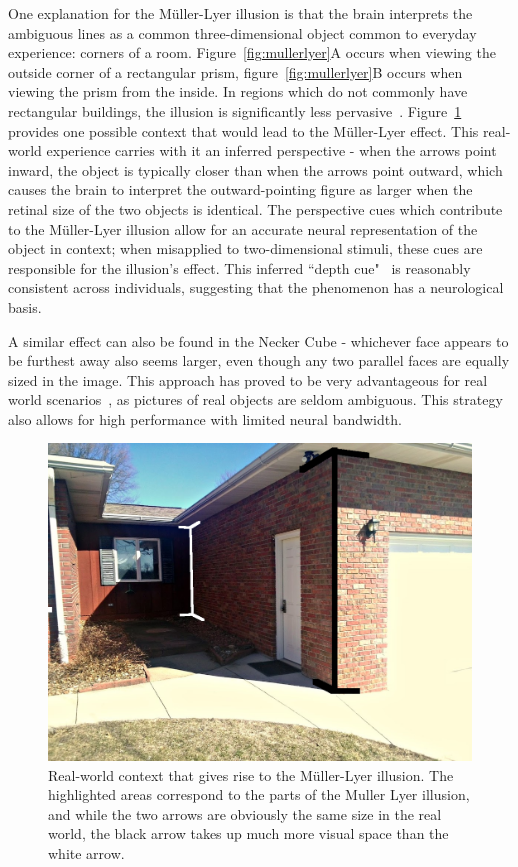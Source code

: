 \documentclass[11pt]{isuthesis}\usepackage[]{graphicx}\usepackage[]{color}
\begin{document}
One explanation for the M\"uller-Lyer illusion \citep{gregory1968perceptual} is that the brain interprets the ambiguous lines as a common three-dimensional object common to everyday experience: corners of a room. Figure~\ref{fig:mullerlyer}A occurs when viewing the outside corner of a rectangular prism, figure~\ref{fig:mullerlyer}B occurs when viewing the prism from the inside.  In regions which do not commonly have rectangular buildings, the illusion is significantly less pervasive~\citep{mullerlyerafrica}. Figure~\ref{fig:mullerlyerreal} provides one possible context that would lead to the M\"uller-Lyer effect. This real-world experience carries with it an inferred perspective - when the arrows point inward, the object is typically closer than when the arrows point outward, which causes the brain to interpret the outward-pointing figure as larger when the retinal size of the two objects is identical. The perspective cues which contribute to the M\"uller-Lyer illusion allow for an accurate neural representation of the object in context; when misapplied to two-dimensional stimuli, these cues are responsible for the illusion's effect. This inferred ``depth cue"~\citep{gregory1968perceptual} is reasonably consistent across individuals, suggesting that the phenomenon has a neurological basis. 

A similar effect can also be found in the Necker Cube - whichever face appears to be furthest away also seems larger, even though any two parallel faces are equally sized in the image. This approach has proved to be very advantageous for real world scenarios~\citep{gregory1968perceptual}, as pictures of real objects are seldom ambiguous. This strategy also allows for high performance with limited neural bandwidth.

\begin{figure}\centering
\includegraphics[width=5in,keepaspectratio=TRUE]{mullerlyerhouse1}
\caption{Real-world context that gives rise to the M\"uller-Lyer illusion. The highlighted areas correspond to the parts of the Muller Lyer illusion, and while the two arrows are obviously the same size in the real world, the black arrow takes up much more visual space than the white arrow.}\label{fig:mullerlyerreal}
\end{figure}
\end{document}
